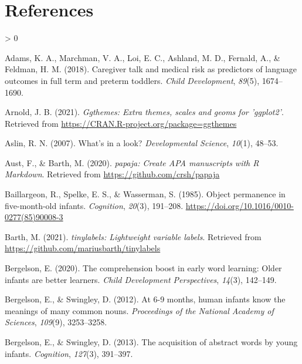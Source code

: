 \documentclass[
  english,
  man,floatsintext]{apa6}
\newlength{\cslhangindent}
\newenvironment{CSLReferences}[2] %
 {%
  \setlength{\parindent}{0pt}
  \ifodd #1 \everypar{\setlength{\hangindent}{\cslhangindent}}\ignorespaces\fi
  \ifnum #2 > 0
  \setlength{\parskip}{#2\baselineskip}
  \fi
 }%
 {}
\begin{document}
\hypertarget{references}{%
\section{References}\label{references}}

\begingroup
\setlength{\parindent}{-0.5in}
\setlength{\leftskip}{0.5in}

\hypertarget{refs}{}
\begin{CSLReferences}{1}{0}
\leavevmode\hypertarget{ref-Adams2018}{}%
Adams, K. A., Marchman, V. A., Loi, E. C., Ashland, M. D., Fernald, A., \& Feldman, H. M. (2018). {Caregiver talk and medical risk as predictors of language outcomes in full term and preterm toddlers}. \emph{Child Development}, \emph{89}(5), 1674--1690.

\leavevmode\hypertarget{ref-R-ggthemes}{}%
Arnold, J. B. (2021). \emph{Ggthemes: Extra themes, scales and geoms for 'ggplot2'}. Retrieved from \url{https://CRAN.R-project.org/package=ggthemes}

\leavevmode\hypertarget{ref-Aslin2007}{}%
Aslin, R. N. (2007). {What's in a look?} \emph{Developmental Science}, \emph{10}(1), 48--53.

\leavevmode\hypertarget{ref-R-papaja}{}%
Aust, F., \& Barth, M. (2020). \emph{{papaja}: {Create} {APA} manuscripts with {R Markdown}}. Retrieved from \url{https://github.com/crsh/papaja}

\leavevmode\hypertarget{ref-Baillargeon1985}{}%
Baillargeon, R., Spelke, E. S., \& Wasserman, S. (1985). {Object permanence in five-month-old infants}. \emph{Cognition}, \emph{20}(3), 191--208. \url{https://doi.org/10.1016/0010-0277(85)90008-3}

\leavevmode\hypertarget{ref-R-tinylabels}{}%
Barth, M. (2021). \emph{{tinylabels}: Lightweight variable labels}. Retrieved from \url{https://github.com/mariusbarth/tinylabels}

\leavevmode\hypertarget{ref-bergelson2020}{}%
Bergelson, E. (2020). The comprehension boost in early word learning: Older infants are better learners. \emph{Child Development Perspectives}, \emph{14}(3), 142--149.

\leavevmode\hypertarget{ref-bergelson2012}{}%
Bergelson, E., \& Swingley, D. (2012). {At 6-9 months, human infants know the meanings of many common nouns.} \emph{Proceedings of the National Academy of Sciences}, \emph{109}(9), 3253--3258.

\leavevmode\hypertarget{ref-bergelson2013}{}%
Bergelson, E., \& Swingley, D. (2013). {{T}he acquisition of abstract words by young infants}. \emph{Cognition}, \emph{127}(3), 391--397.


\end{CSLReferences}
\end{document}
